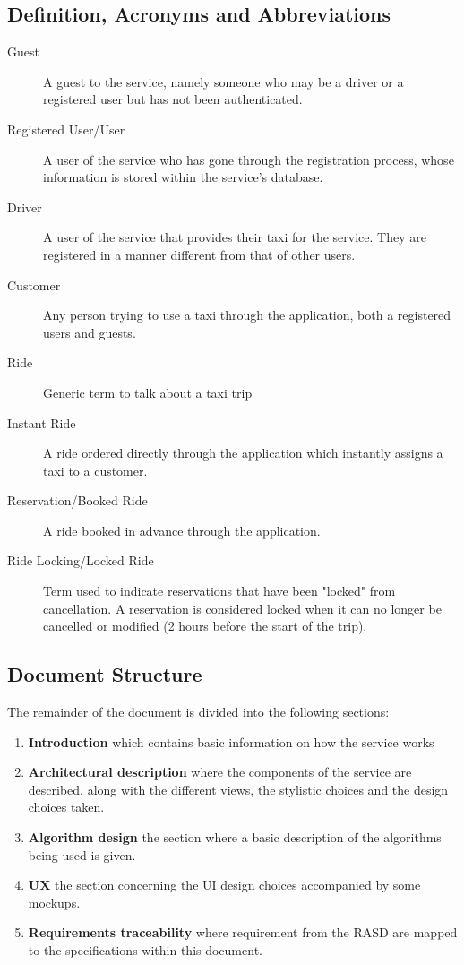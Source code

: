 \subsection{Definition, Acronyms and Abbreviations}
\begin{description}
	\item[Guest]
		A guest to the service, namely someone who may be a driver or a registered user but has not been authenticated.
	\item[Registered User/User]
		A user of the service who has gone through the registration process, whose information is stored within the service's database.
	\item[Driver]
		A user of the service that provides their taxi for the service. They are registered in a manner different from that of other users.
	\item[Customer]
		Any person trying to use a taxi through the application, both a registered users and guests.
	\item[Ride]
		Generic term to talk about a taxi trip
	\item[Instant Ride]
		A ride ordered directly through the application which instantly assigns a taxi to a customer.
	\item[Reservation/Booked Ride]
		A ride booked in advance through the application.
	\item[Ride Locking/Locked Ride]
		Term used to indicate reservations that have been "locked" from cancellation. A reservation is considered locked when it can no
		longer be cancelled or modified (2 hours before the start of the trip).
\end{description}

\subsection{Document Structure}
	The remainder of the document is divided into the following sections:
	\begin{enumerate}
	\item \textbf{Introduction} which contains basic information on how the service works
	\item \textbf{Architectural description} where the components of the service are described, along with the different views, the stylistic choices and the design choices taken.
	\item \textbf{Algorithm design} the section where a basic description of the algorithms being used is given.
	\item \textbf{UX} the section concerning the UI design choices accompanied by some mockups.
	\item \textbf{Requirements traceability} where requirement from the RASD are mapped to the specifications within this document.
	\end{enumerate}
